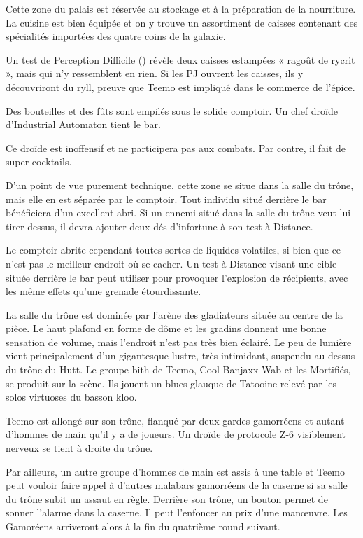 \documentclass[a4paper,10pt,twoside,twocolumn,openany]{book}
\begin{document}
Cette zone du palais est réservée au stockage et à la
préparation de la nourriture. La cuisine est bien équipée et on y trouve un assortiment de caisses contenant
des spécialités importées des quatre coins de la galaxie.

Un test de Perception Difficile (\difficulty \difficulty \difficulty) révèle deux
caisses estampées « ragoût de rycrit », mais qui n’y ressemblent en rien. Si les PJ ouvrent les caisses, ils y découvriront du ryll, preuve que Teemo est impliqué dans
le commerce de l’épice.

\subtitle{BAR DE LA CANTINA}
Des bouteilles et des fûts sont empilés sous le solide
comptoir. Un chef droïde d'Industrial Automaton tient
le bar.

Ce droïde est inoffensif et ne participera pas aux combats. Par contre, il fait de super cocktails.

D’un point de vue purement technique, cette zone se
situe dans la salle du trône, mais elle en est séparée par
le comptoir. Tout individu situé derrière le bar bénéficiera
d’un excellent abri. Si un ennemi situé dans la salle du
trône veut lui tirer dessus, il devra ajouter deux dés d’infortune \boost \boost à son test à Distance.

Le comptoir abrite cependant toutes sortes de liquides
volatiles, si bien que ce n’est pas le meilleur endroit où
se cacher. Un test à Distance visant une cible située derrière le bar peut utiliser \advantage \advantage pour provoquer l’explosion de récipients, avec les même effets qu’une grenade
étourdissante.

\subtitle{SALLE DU TRÔNE DE TEEMO}
La salle du trône est dominée par l’arène des gladiateurs
située au centre de la pièce. Le haut plafond en forme
de dôme et les gradins donnent une bonne sensation
de volume, mais l’endroit n’est pas très bien éclairé. Le
peu de lumière vient principalement d’un gigantesque
lustre, très intimidant, suspendu au-dessus du trône du
Hutt. Le groupe bith de Teemo, Cool Banjaxx Wab et
les Mortifiés, se produit sur la scène. Ils jouent un blues
glauque de Tatooine relevé par les solos virtuoses du
basson kloo.

Teemo est allongé sur son trône, flanqué par deux
gardes gamorréens et autant d’hommes de main qu’il y a
de joueurs. Un droïde de protocole Z-6 visiblement nerveux se tient à droite du trône.

Par ailleurs, un autre groupe d’hommes de main est
assis à une table et Teemo peut vouloir faire appel
à d’autres malabars gamorréens de la caserne si sa
salle du trône subit un assaut en règle. Derrière son
trône, un bouton permet de sonner l’alarme dans la
caserne. Il peut l’enfoncer au prix d’une manœuvre.
Les Gamoréens arriveront alors à la fin du quatrième
round suivant.
\end{document}

